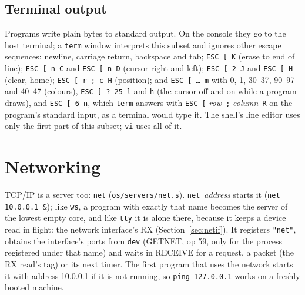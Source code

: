\subsection{Terminal output}
Programs write plain bytes to standard output. On the console they go to the host terminal; a
\texttt{term} window interprets this subset and ignores other escape sequences: newline, carriage
return, backspace and tab; \texttt{ESC [ K} (erase to end of line); \texttt{ESC [ n C} and
\texttt{ESC [ n D} (cursor right and left); \texttt{ESC [ 2 J} and \texttt{ESC [ H} (clear, home);
\texttt{ESC [ r ; c H} (position); and \texttt{ESC [ \ldots\ m} with 0, 1, 30--37, 90--97 and 40--47
(colours), \texttt{ESC [ ? 25 l} and \texttt{h} (the cursor off and on while a program draws), and
\texttt{ESC [ 6 n}, which \texttt{term} answers with \texttt{ESC [}\textit{ row}\texttt{ ;}\textit{
column}\texttt{ R} on the program's standard input, as a terminal would type it. The shell's line
editor uses only the first part of this subset; \texttt{vi} uses all of it.

\section{Networking}\label{sec:os-net}

TCP/IP is a server too: \texttt{net} (\texttt{os/servers/net.s}). \texttt{net}~\textit{address}
starts it (\texttt{net 10.0.0.1 \&}); like \texttt{ws}, a program with exactly that name becomes the
server of the lowest empty core, and like \texttt{tty} it is alone there, because it keeps a device read
in flight: the network interface's RX (Section~\ref{sec:netif}). It registers \texttt{"net"}, obtains
the interface's ports from \texttt{dev} (GETNET, op 59, only for the process registered under that
name) and waits in RECEIVE for a request, a packet (the RX read's tag) or its next timer. The first
program that uses the network starts it with address 10.0.0.1 if it is not running, so
\texttt{ping 127.0.0.1} works on a freshly booted machine.

